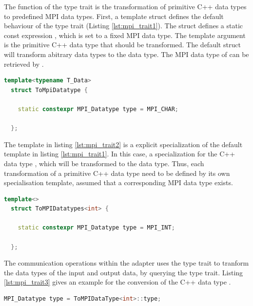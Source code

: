 The function of the type trait is the transformation of primitive C++
data types to predefined MPI data types.  First, a template struct
defines the default behaviour of the type trait (Listing
\ref{lst:mpi_trait1}). The struct defines a static const expression
, which is set to a fixed MPI data type. The template
argument  is the primitive C++ data type that should be
transformed. The default struct will transform abitrary data types
 to the  data type. The MPI data type of
 can be retrieved by .


\begin{lstlisting}[language=C++, label=lst:mpi_trait1]
  template<typename T_Data> 
  struct ToMpiDatatype { 

    static constexpr MPI_Datatype type = MPI_CHAR; 

  };
\end{lstlisting}


The template in listing \ref{lst:mpi_trait2} is a explicit
specialization of the default template in listing
\ref{lst:mpi_trait1}. In this case, a specialization for the C++ data
type , which will be transformed to the  data type.  Thus,
each transformation of a primitive C++ data type need to be defined
by its own specialisation template, assumed that a corresponding
MPI data type exists.

\begin{lstlisting}[language=C++, label=lst:mpi_trait2]
  template<>
  struct ToMPIDatatypes<int> { 

    static constexpr MPI_Datatype type = MPI_INT; 

  };
\end{lstlisting}

The communication operations within the adapter uses the type trait to
tranform the data types of the input and output data, by querying the
type trait. Listing \ref{lst:mpi_trait3} gives an example for the conversion 
of the C++ data type .

\begin{lstlisting}[language=C++, label=lst:mpi_trait3]
  MPI_Datatype type = ToMPIDataType<int>::type;
\end{lstlisting}

